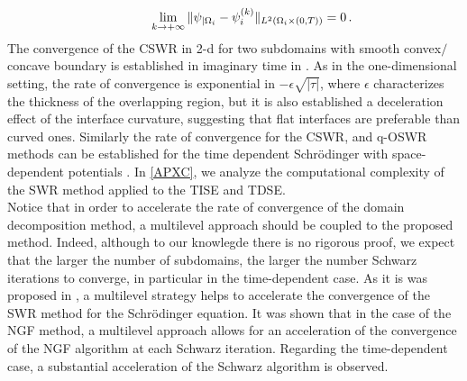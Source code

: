 \begin{eqnarray*}
\hspace*{1cm}\lim_{k \rightarrow +\infty}\|\psi_{|\Omega_i} - \psi_i^{(k)}\|_{L^2(\Omega_i\times(0,T))} = 0 \, .
\end{eqnarray*}
The convergence of the CSWR in 2-d for two subdomains with smooth convex$/$concave boundary is established in imaginary time in \cite{lorin-TBS2}. As in the one-dimensional setting, the rate of convergence is exponential in $-\epsilon \sqrt{|\tau|}$, where $\epsilon$ characterizes the thickness of the overlapping region, but it is also established a deceleration effect of the interface curvature, suggesting that flat interfaces are preferable than curved ones. Similarly the rate of convergence for the CSWR, and q-OSWR methods can be established for the time dependent Schr\"odinger with space-dependent potentials \cite{lorin-TBS3}. In \ref{APXC}, we analyze the computational complexity of the SWR method applied to the TISE and TDSE. \\
Notice that in order to accelerate the rate of convergence of the domain decomposition method, a multilevel approach should be coupled to the proposed method. Indeed, although to our knowlegde there is no rigorous proof, we expect that the larger the number of subdomains, the larger the number Schwarz iterations to converge, in particular in the time-dependent case. As it is was proposed in \cite{multilevel}, a multilevel strategy helps to accelerate the convergence of the SWR method for the Schr\"odinger equation. It was shown that in the case of the NGF method, a multilevel approach allows for an acceleration of the convergence of the NGF algorithm at each Schwarz iteration. Regarding the time-dependent case, a substantial acceleration of the Schwarz algorithm is observed.
